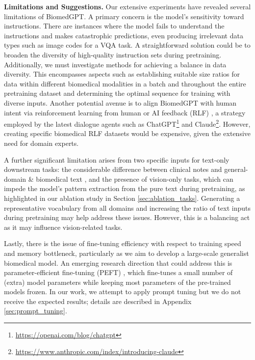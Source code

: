 \documentclass[10pt]{article} \usepackage[preprint]{tmlr}
\begin{document}
\noindent \textbf{Limitations and Suggestions.} Our extensive experiments have revealed several limitations of BiomedGPT. A primary concern is the model's sensitivity toward instructions. There are instances where the model fails to understand the instructions and makes catastrophic predictions, even producing irrelevant data types such as image codes for a VQA task. A straightforward solution could be to broaden the diversity of high-quality instruction sets during pretraining. Additionally, we must investigate methods for achieving a balance in data diversity. This encompasses aspects such as establishing suitable size ratios for data within different biomedical modalities in a batch and throughout the entire pretraining dataset and determining the optimal sequence for training with diverse inputs. Another potential avenue is to align BiomedGPT with human intent via reinforcement learning from human or AI feedback (RLF) \citep{ouyang2022training, bai2022constitutional, zhou2023comprehensive}, a strategy employed by the latest dialogue agents such as ChatGPT\footnote{\url{https://openai.com/blog/chatgpt}} and Claude\footnote{\url{https://www.anthropic.com/index/introducing-claude}}. However, creating specific biomedical RLF datasets would be expensive, given the extensive need for domain experts.

A further significant limitation arises from two specific inputs for text-only downstream tasks: the considerable difference between clinical notes and general-domain \& biomedical text \citep{lehman2023we, gu2021domain}, and the presence of vision-only tasks, which can impede the model's pattern extraction from the pure text during pretraining, as highlighted in our ablation study in Section \ref{sec:ablation_tasks}. Generating a representative vocabulary from all domains and increasing the ratio of text inputs during pretraining may help address these issues. However, this is a balancing act as it may influence vision-related tasks. 

Lastly, there is the issue of fine-tuning efficiency with respect to training speed and memory bottleneck, particularly as we aim to develop a large-scale generalist biomedical model. An emerging research direction that could address this is parameter-efficient fine-tuning (PEFT) \citep{ding2023parameter, liu2022few, lialin2023scaling}, which fine-tunes a small number of (extra) model parameters while keeping most parameters of the pre-trained models frozen. In our work, we attempt to apply prompt tuning but we do not receive the expected results; details are described in Appendix \ref{sec:prompt_tuning}.
\end{document}
